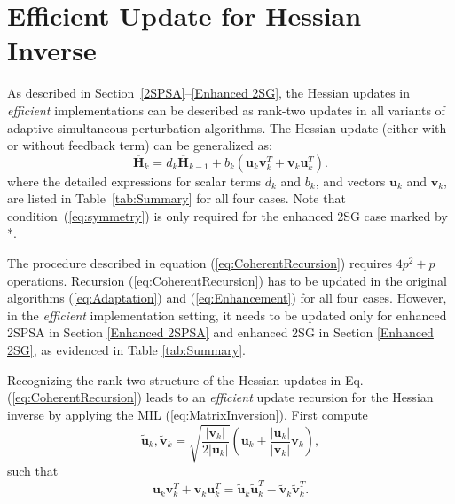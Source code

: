\documentclass[conference,10.3cpt]{IEEEtran}
\newcommand{\oH}{\bm{\overline{H}}}
\begin{document}
\section{Efficient Update for Hessian Inverse} \label{Efficient Update}
As described in Section~\ref{2SPSA}--\ref{Enhanced 2SG}, the
Hessian updates in \textit{efficient} implementations can be described as rank-two updates in all variants of adaptive simultaneous perturbation algorithms. The Hessian update (either with or without feedback term) can be generalized as:
\begin{equation}
\label{eq:CoherentRecursion}
  \oH_{k}=d_k\oH_{k-1}+b_k(\bm{u}_k \bm{v}_k^{T}+\bm{v}_k \bm{u}_k^{T}).
\end{equation}
where the detailed expressions for scalar terms $d_k$ and $b_k$, and vectors $\bm{u}_k$ and $\bm{v}_k$, are listed in Table~\ref{tab:Summary} for all four cases. Note that
condition~(\ref{eq:symmetry}) is only required for the
enhanced 2SG case marked by *.

The procedure described in equation
(\ref{eq:CoherentRecursion}) requires $4p^2 + p$ operations. Recursion
(\ref{eq:CoherentRecursion}) has to be updated in the original algorithms (\ref{eq:Adaptation}) and (\ref{eq:Enhancement})
for all four cases. However, in the \textit{efficient} implementation
setting, it needs to be updated only for enhanced 2SPSA in
Section \ref{Enhanced 2SPSA} and enhanced 2SG in Section
\ref{Enhanced 2SG}, as evidenced in Table \ref{tab:Summary}.

Recognizing the rank-two structure of the Hessian updates in Eq. (\ref{eq:CoherentRecursion}) leads to
an \textit{efficient} update recursion for the Hessian inverse by applying the MIL (\ref{eq:MatrixInversion}). First compute
\begin{equation} \label{eq:Transform}
 \bm{\tilde{u}}_k, \bm{\tilde{v}}_k =
  \sqrt{\frac{|\bm{v}_k|}{2|\bm{u}_k|}} (\bm{u}_k \pm
  \frac{|\bm{u}_k|}{|\bm{v}_k|}\bm{v}_k),
\end{equation}
such that
\begin{equation*} \bm{u}_k \bm{v}_k^{T}+\bm{v}_k \bm{u}_k^{T}
  = \bm{\tilde{u}}_k \bm{\tilde{u}}_k^{T} - \bm{\tilde{v}}_k
  \bm{\tilde{v}}_k^{T}.
\end{equation*}
\end{document}
